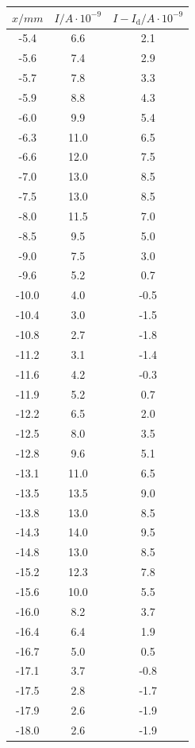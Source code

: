 \begin{table}
\centering
\begin{minipage}{0.46\textwidth}
	\begin{tabular}{c|c|c}
		\toprule
		{$x / mm$} & {$I / A\cdot10^{-9}$}& {$I - I_\text{d} / A\cdot10^{-9}$} \\
		\hline
        \midrule
        -5.4 & 6.6&2.1\\
        -5.6 & 7.4&2.9\\
        -5.7 & 7.8&3.3\\
        -5.9 & 8.8&4.3\\
        -6.0 & 9.9&5.4\\
        -6.3 & 11.0&6.5\\
        -6.6 & 12.0&7.5\\
        -7.0 & 13.0&8.5\\
        -7.5 & 13.0&8.5\\
        -8.0 & 11.5&7.0\\
        -8.5 & 9.5&5.0\\
        -9.0 & 7.5&3.0\\
        -9.6 & 5.2&0.7\\
        -10.0 & 4.0&-0.5\\
        -10.4 & 3.0&-1.5\\
        -10.8 & 2.7&-1.8\\
        -11.2 & 3.1&-1.4\\
        -11.6 & 4.2&-0.3\\
        -11.9 & 5.2&0.7\\
        -12.2 & 6.5&2.0\\
        -12.5 & 8.0&3.5\\
        -12.8 & 9.6&5.1\\
        -13.1 & 11.0&6.5\\
        -13.5 & 13.5&9.0\\
        -13.8 & 13.0&8.5\\
        -14.3 & 14.0&9.5\\
        -14.8 & 13.0&8.5\\
        -15.2 & 12.3&7.8\\
        -15.6 & 10.0&5.5\\
        -16.0 & 8.2&3.7\\
        -16.4 & 6.4&1.9\\
        -16.7 & 5.0&0.5\\
        -17.1 & 3.7&-0.8\\
        -17.5 & 2.8&-1.7\\
        -17.9 & 2.6&-1.9\\
        -18.0 & 2.6 &-1.9\\
		\bottomrule 
	\end{tabular}
\end{minipage}
\end{table}

